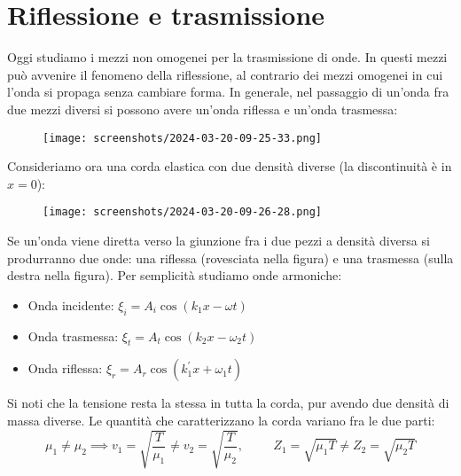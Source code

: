 \section{Riflessione e trasmissione}
Oggi studiamo i mezzi non omogenei per la trasmissione di onde. In questi mezzi può avvenire il fenomeno della riflessione, al contrario dei mezzi omogenei in cui l'onda si propaga senza cambiare forma. In generale, nel passaggio di un'onda fra due mezzi diversi si possono avere un'onda riflessa e un'onda trasmessa:

\begin{figure}[H]
	\centering
	\texttt{[image: screenshots/2024-03-20-09-25-33.png]}
\end{figure}

Consideriamo ora una corda elastica con due densità diverse (la discontinuità è in \(x=0\)):

\begin{figure}[H]
	\centering
	\texttt{[image: screenshots/2024-03-20-09-26-28.png]}
\end{figure}
Se un'onda viene diretta verso la giunzione fra i due pezzi a densità diversa si produrranno due onde: una riflessa (rovesciata nella figura) e una trasmessa (sulla destra nella figura). Per semplicità studiamo onde armoniche:

\begin{itemize}
	\item Onda incidente: \(\xi _i = A_i \cos (k_1 x -\omega t)\) 	
	\item Onda trasmessa: \(\xi _t = A_t \cos (k_2 x - \omega _2 t)\) 
	\item Onda riflessa: \(\xi _r = A_r \cos (k_1^{\prime} x + \omega _1 t)\) 
\end{itemize}

Si noti che la tensione resta la stessa in tutta la corda, pur avendo due densità di massa diverse. Le quantità che caratterizzano la corda variano fra le due parti:
\[
	\mu _1 \neq \mu _2 \implies v_1 = \sqrt{\frac{T}{\mu _1}} \neq v_2 = \sqrt{\frac{T}{\mu _2}},\hspace{1cm} Z_1=\sqrt{\mu _1 T}\neq Z_2 = \sqrt{\mu _2 T}   
\]

